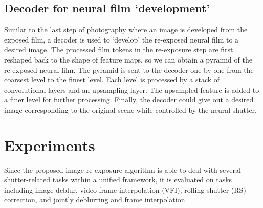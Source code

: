 \documentclass[10pt,twocolumn,letterpaper]{article}
\begin{document}
\subsection{Decoder for neural film `development'}
\label{sec:Decoder}
Similar to the last step of photography where an image is developed from the exposed film,
a decoder is used to `develop' the re-exposed neural film to a desired image.
The processed film tokens in the re-exposure step are first reshaped back to the shape of feature maps, so we can obtain a pyramid of the re-exposed neural film.
The pyramid is sent to the decoder one by one from the coarsest level to the finest level.
Each level is processed by a stack of convolutional layers and an upsampling layer. 
The upsampled feature is added to a finer level for further processing.
Finally, the decoder could give out a desired image corresponding to the original scene while controlled by the neural shutter.








































 
\section{Experiments}

Since the proposed image re-exposure algorithm is able to deal with several shutter-related tasks within a unified framework, it is evaluated on tasks including image deblur, video frame interpolation (VFI), rolling shutter (RS) correction, and jointly deblurring and frame interpolation.
\end{document}
